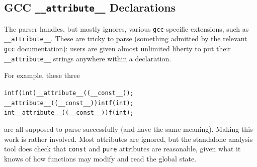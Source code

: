 \documentclass{article}
\begin{document}
\subsection{GCC \texttt{__attribute__} Declarations}
\label{sec:gcc-attributes}

The parser handles, but mostly ignores, various \texttt{gcc}-specific
extensions, such as \texttt{__attribute__}.  These are tricky to parse
(something admitted by the relevant \texttt{gcc} documentation): users
are given almost unlimited liberty to put their \texttt{__attribute__}
strings anywhere within a declaration.

\smallskip\noindent
For example, these three
\begin{alltt}
   int f(int) __attribute__((__const__));
   __attribute__((__const__)) int f(int);
   int __attribute__((__const__)) f(int);
\end{alltt}
are all supposed to parse successfully (and have the same meaning).
Making this work is rather involved.  Most attributes are ignored, but
the standalone analysis tool does check that \texttt{const} and
\texttt{pure} attributes are reasonable, given what it knows of how
functions may modify and read the global state.



\end{document}
